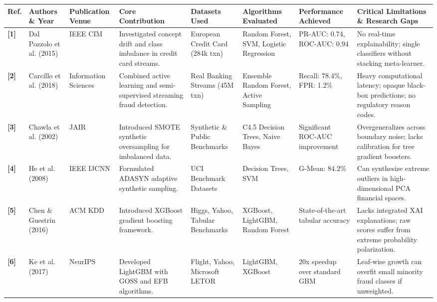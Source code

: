 \documentclass[12pt,a4paper,oneside]{report}
\begin{document}
\begin{table}[H]
\centering
\footnotesize
\begin{adjustbox}{width=\textwidth,center}
\begin{tabular}{| l | l | l | l | l | l | l | l |}
\hline
\rowcolor{tableheader} \textbf{Ref.} & \textbf{Authors \& Year} & \textbf{Publication Venue} & \textbf{Core Contribution} & \textbf{Datasets Used} & \textbf{Algorithms Evaluated} & \textbf{Performance Achieved} & \textbf{Critical Limitations \& Research Gaps} \\ \hline
\textbf{[1]} & Dal Pozzolo et al. (2015) & IEEE CIM & Investigated concept drift and class imbalance in credit card streams. & European Credit Card (284k txn) & Random Forest, SVM, Logistic Regression & PR-AUC: 0.74, ROC-AUC: 0.94 & No real-time explainability; single classifiers without stacking meta-learner. \\ \hline
\rowcolor{tablealt} \textbf{[2]} & Carcillo et al. (2018) & Information Sciences & Combined active learning and semi-supervised streaming fraud detection. & Real Banking Streams (45M txn) & Ensemble Random Forest, Active Sampling & Recall: 78.4\%, FPR: 1.2\% & Heavy computational latency; opaque black-box predictions; no regulatory reason codes. \\ \hline
\textbf{[3]} & Chawla et al. (2002) & JAIR & Introduced SMOTE synthetic oversampling for imbalanced data. & Synthetic \& Public Benchmarks & C4.5 Decision Trees, Naive Bayes & Significant ROC-AUC improvement & Overgeneralizes across boundary noise; lacks calibration for tree gradient boosters. \\ \hline
\rowcolor{tablealt} \textbf{[4]} & He et al. (2008) & IEEE IJCNN & Formulated ADASYN adaptive synthetic sampling. & UCI Benchmark Datasets & Decision Trees, SVM & G-Mean: 84.2\% & Can synthesize extreme outliers in high-dimensional PCA financial spaces. \\ \hline
\textbf{[5]} & Chen \& Guestrin (2016) & ACM KDD & Introduced XGBoost gradient boosting framework. & Higgs, Yahoo, Tabular Benchmarks & XGBoost, LightGBM, Random Forest & State-of-the-art tabular accuracy & Lacks integrated XAI explanations; raw scores suffer from extreme probability polarization. \\ \hline
\rowcolor{tablealt} \textbf{[6]} & Ke et al. (2017) & NeurIPS & Developed LightGBM with GOSS and EFB algorithms. & Flight, Yahoo, Microsoft LETOR & LightGBM, XGBoost & 20x speedup over standard GBM & Leaf-wise growth can overfit small minority fraud classes if unweighted. \\ \hline

\end{tabular}
\end{adjustbox}
\end{table}
\end{document}
